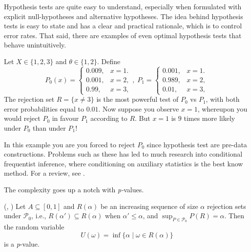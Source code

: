 Hypothesis tests are quite easy to understand, especially when formulated with explicit null-hypotheses and alternative hypotheses. The idea behind hypothesis tests is easy to state and has a clear and practical rationale, which is to control error rates. That said, there are examples of even optimal hypothesis tests that behave unintuitively. 

\begin{example}
 Let $X\in\{1,2,3\}$ and $\theta\in\{1,2\}$. Define
\[
P_{0}(x)=\begin{cases}
0.009, & x=1.\\
0.001, & x=2,\\
0.99, & x=3,
\end{cases},\;P_{1}=\begin{cases}
0.001, & x=1.\\
0.989, & x=2,\\
0.01, & x=3,
\end{cases}
\]
The rejection set $R=\{x\neq3\}$ is the most powerful test of $P_{0}$ vs $P_{1}$, with both error probabilities equal to $0.01$. Now suppose you observe $x=1$, whereupon you would reject $P_{0}$ in favour $P_{1}$ according to $R$. But $x=1$ is $9$ times more likely under $P_{0}$ than under $P_{1}$!
\end{example}

In this example you are you forced to reject $P_0$ since hypothesis test are pre-data constructions. Problems such as these has led to much research into conditional frequentist inference, where conditioning on auxiliary statistics is the best know method. For a review, see \textcite{Goutis1995-ga}.

The complexity goes up a notch with \emph{p-}values.
\begin{definition}
\label{def:p-value}(\textcite[][Chapter 3.3]{Lehmann2005-sp}, \textcite{Bayarri2000-dt}) Let
$A\subseteq[0,1]$ and $R(\alpha)$ be an increasing sequence of size
$\alpha$ rejection sets under $\mathcal{P}_{0}$, i.e., $R(\alpha')\subseteq R(\alpha)$
when $\alpha'\leq\alpha$, and $\sup_{P\in\mathcal{P}_{0}}P(R)=\alpha$.
Then the random variable
\begin{equation}
U(\omega)=\inf\{\alpha\mid\omega\in R(\alpha)\}\label{eq:size p-value}
\end{equation}
is a \emph{p}-value. 
\end{definition}

